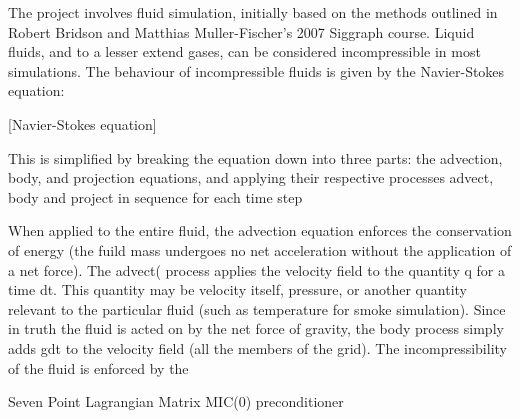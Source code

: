 \documentclass{article}
\begin{document}
The project involves fluid simulation, initially based on the methods outlined in Robert Bridson and Matthias Muller-Fischer's 2007 Siggraph course.
Liquid fluids, and to a lesser extend gases, can be considered incompressible in most simulations. The behaviour of incompressible fluids is given by the Navier-Stokes equation:

[Navier-Stokes equation]

This is simplified by breaking the equation down into three parts: the advection, body, and projection equations, and applying their respective processes advect, body and project in sequence for each time step


When applied to the entire fluid, the advection equation enforces the conservation of energy (the fuild mass undergoes no net acceleration without the application of a net force). The advect( process applies the velocity field to the quantity q for a time dt. This quantity may be velocity itself, pressure, or another quantity relevant to the particular fluid (such as temperature for smoke simulation).
Since in truth the fluid is acted on by the net force of gravity, the body process simply adds gdt to the velocity field (all the members of the grid).
The incompressibility of the fluid is enforced by the 

Seven Point Lagrangian Matrix
MIC(0) preconditioner
\end{document}
